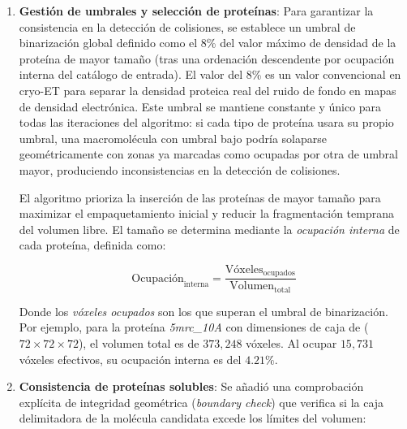 \begin{enumerate}
    Este diseño produce un empaquetamiento en dos niveles: cuando la inserción es exitosa, el algoritmo continúa en la misma región (\textit{crecimiento local}), favoreciendo clústeres compactos; cuando falla, se muestrea una nueva semilla aleatoria del espacio global (\textit{reset global}), evitando que el algoritmo quede atrapado en zonas saturadas. El proceso finaliza al acumular $T_{cluster}$ fallos consecutivos para el tipo de proteína en curso, momento en el que el algoritmo pasa al siguiente tipo.

     \item \textbf{Gestión de umbrales y selección de proteínas}: Para garantizar la consistencia en la detección de colisiones, se establece un umbral de binarización global definido como el 8\% del valor máximo de densidad de la proteína de mayor tamaño (tras una ordenación descendente por ocupación interna del catálogo de entrada). El valor del 8\% es un valor convencional en cryo-ET para separar la densidad proteica real del ruido de fondo en mapas de densidad electrónica. Este umbral se mantiene constante y único para todas las iteraciones del algoritmo: si cada tipo de proteína usara su propio umbral, una macromolécula con umbral bajo podría solaparse geométricamente con zonas ya marcadas como ocupadas por otra de umbral mayor, produciendo inconsistencias en la detección de colisiones.

    El algoritmo prioriza la inserción de las proteínas de mayor tamaño para maximizar el empaquetamiento inicial y reducir la fragmentación temprana del volumen libre. El tamaño se determina mediante la \textit{ocupación interna} de cada proteína, definida como:

    \begin{equation}
        \text{Ocupación}_{\text{interna}} = \frac{\text{Vóxeles}_{\text{ocupados}}}{\text{Volumen}_{\text{total}}}
    \end{equation}

    Donde los \textit{vóxeles ocupados} son los que superan el umbral de binarización. Por ejemplo, para la proteína \textit{5mrc\_10A} con dimensiones de caja de ($72 \times 72 \times 72$), el volumen total es de $373{,}248$ vóxeles. Al ocupar $15{,}731$ vóxeles efectivos, su ocupación interna es del $4.21\%$.

    \item \textbf{Consistencia de proteínas solubles}: Se añadió una comprobación explícita de integridad geométrica (\textit{boundary check}) que verifica si la caja delimitadora de la molécula candidata excede los límites del volumen:


\end{enumerate}
